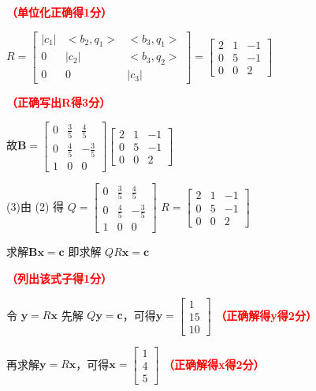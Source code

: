 \documentclass[12pt,a4paper,openany,twoside]{ctexbook}
\begin{document}
\begin{Solution}
	\hfill \textcolor{red}{\textbf{（单位化正确得1分）}}

	$R=\begin{bmatrix}  
	|c_1| & <b_2,q_1> & <b_3,q_1> \\  
	0 & |c_2| & <b_3,q_2> \\
	0 & 0 & |c_3|
	\end{bmatrix}=\begin{bmatrix}  
	2 & 1 & -1 \\  
	0 & 5 & -1 \\
	0 & 0 & 2
	\end{bmatrix}$

	\hfill \textcolor{red}{\textbf{（正确写出R得3分）}}
	
	故$\mathbf{B}=\begin{bmatrix}  
	0 & \frac{3}{5} & \frac{4}{5}\\  
	0 & \frac{4}{5} & -\frac{3}{5} \\
	1 & 0 & 0
	\end{bmatrix} \begin{bmatrix}  
	2 & 1 & -1 \\  
	0 & 5 & -1 \\
	0 & 0 & 2
	\end{bmatrix}$

	(3)由 (2) 得 $Q=\begin{bmatrix}  
		0 & \frac{3}{5} & \frac{4}{5}\\  
		0 & \frac{4}{5} & -\frac{3}{5} \\
		1 & 0 & 0
		\end{bmatrix}$ $R=\begin{bmatrix}  
		2 & 1 & -1 \\  
		0 & 5 & -1 \\
		0 & 0 & 2
		\end{bmatrix}$
		
		求解$\mathbf{Bx}= \mathbf{c}$ 即求解 $QR\mathbf{x}=\mathbf{c}$ 
		
		\hfill \textcolor{red}{\textbf{（列出该式子得1分）}}

		令 $\mathbf{y}=R\mathbf{x}$ 先解 $Q\mathbf{y}=\mathbf{c}$，可得$\mathbf{y}=\begin{bmatrix}  
		1 \\  
		15 \\
		10 
		\end{bmatrix}$
		\hfill \textcolor{red}{\textbf{（正确解得y得2分）}}

		再求解$\mathbf{y}=R\mathbf{x}$，可得$\mathbf{x}=\begin{bmatrix}  
		1 \\  
		4 \\
		5 
		\end{bmatrix}$
		\hfill \textcolor{red}{\textbf{（正确解得x得2分）}}


\end{Solution}
\end{document}
